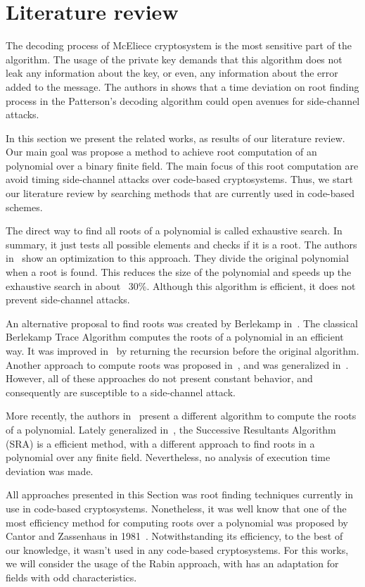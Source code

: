 \section{Literature review}
The decoding process of McEliece cryptosystem is the most sensitive part of the algorithm. The usage of the private key demands that this algorithm does not leak any information about the key, or even, any information about the error added to the message. The authors in \cite{bucerzan2017improved} shows that a time deviation on root finding process in the Patterson's decoding algorithm could open avenues for side-channel attacks. 

In this section we present the related works, as results of our literature review. Our main goal was propose a method to achieve root computation of an polynomial over a binary finite field. The main focus of this root computation are avoid timing side-channel attacks over code-based cryptosystems. Thus, we start our literature review by searching methods that are currently used in code-based schemes.

The direct way to find all roots of a polynomial is called exhaustive search. In summary, it just tests all possible elements and checks if it is a root. The authors in~\cite{strenzke2012fast} show an optimization to this approach. They divide the original polynomial when a root is found. This reduces the size of the polynomial and speeds up the exhaustive search in about ~30\%. Although this algorithm is efficient, it does not prevent side-channel attacks.

An alternative proposal to find roots was created by Berlekamp in~\cite{berlekamp1970factoring}. The classical Berlekamp Trace Algorithm computes the roots of a polynomial in an efficient way. It was improved in~\cite{strenzke2012fast} by returning the recursion before the original algorithm. Another approach to compute roots was proposed in~\cite{fedorenko2002finding}, and was generalized in~\cite{Skachek2008, biswas2009}. However, all of these approaches do not present constant behavior, and consequently are susceptible to a side-channel attack.

More recently, the authors in~\cite{petit2014finding} present a different algorithm to compute the roots of a polynomial. Lately generalized in~\cite{petit2016finding}, the Successive Resultants Algorithm (SRA) is a efficient method, with a different approach to find roots in a polynomial over any finite field. Nevertheless, no analysis of execution time deviation was made.

All approaches presented in this Section was root finding techniques currently in use in code-based cryptosystems. Nonetheless, it was well know that one of the most efficiency method for computing roots over a polynomial was proposed by Cantor and Zassenhaus in 1981~\cite{cantor1981new}. Notwithstanding its efficiency, to the best of our knowledge, it wasn't used in any code-based cryptosystems. For this works, we will consider the usage of the Rabin approach, with has an adaptation for fields with odd characteristics.